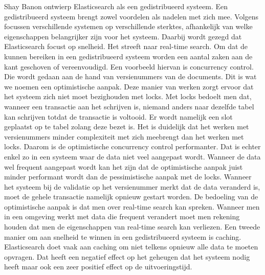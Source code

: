 Shay Banon ontwierp Elasticsearch als een gedistribueerd systeem. Een gedistribueerd systeem brengt zowel voordelen als nadelen met zich mee. Volgens \textcite{Brasetvik2013} focussen verschillende systemen op verschillende sterktes, afhankelijk van welke eigenschappen belangrijker zijn voor het systeem. Daarbij wordt gezegd dat Elasticsearch focust op snelheid. Het streeft naar real-time search. Om dat de kunnen bereiken in een gedistribueerd systeem worden een aantal zaken aan de kant geschoven of vereenvoudigd. Een voorbeeld hiervan is concurrency control. Die wordt gedaan aan de hand van versienummers van de documents. Dit is wat we noemen een optimistische aanpak. Deze manier van werken zorgt ervoor dat het systeem zich niet moet bezighouden met locks. Met locks bedoelt men dat, wanneer een transactie aan het schrijven is, niemand anders naar dezelfde tabel kan schrijven totdat de transactie is voltooid. Er wordt namelijk een slot geplaatst op te tabel zolang deze bezet is. Het is duidelijk dat het werken met versienummers minder complexiteit met zich meebrengt dan het werken met locks. Daarom is de optimistische concurrency control performanter. Dat is echter enkel zo in een systeem waar de data niet veel aangepast wordt. Wanneer de data wel frequent aangepast wordt kan het zijn dat de optimistische aanpak juist minder performant wordt dan de pessimistische aanpak met de locks. Wanneer het systeem bij de validatie op het versienummer merkt dat de data veranderd is, moet de gehele transactie namelijk opnieuw gestart worden. De bedoeling van de optimistische aanpak is dat men over real-time search kan spreken. Wanneer men in een omgeving werkt met data die frequent verandert moet men rekening houden dat men de eigenschappen van real-time search kan verliezen. Een tweede manier om aan snelheid te winnen in een gedistribueerd systeem is caching. Elasticsearch doet vaak aan caching om niet telkens opnieuw alle data te moeten opvragen. Dat heeft een negatief effect op het geheugen dat het systeem nodig heeft maar ook een zeer positief effect op de uitvoeringstijd.

